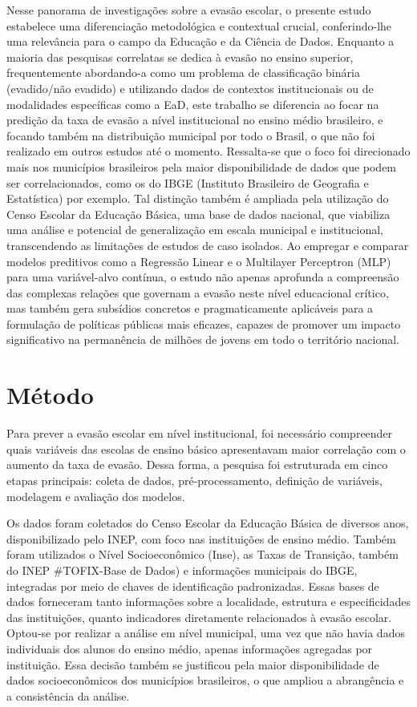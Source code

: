 \documentclass[english, spanish, brazilian]{RBIEarticle} %
\begin{document}
Nesse panorama de investigações sobre a evasão escolar, o presente estudo estabelece uma diferenciação metodológica e contextual crucial, conferindo-lhe uma relevância para o campo da Educação e da Ciência de Dados. Enquanto a maioria das pesquisas correlatas se dedica à evasão no ensino superior, frequentemente abordando-a como um problema de classificação binária (evadido/não evadido) e utilizando dados de contextos institucionais ou de modalidades específicas como a EaD, este trabalho se diferencia ao focar na predição da taxa de evasão a nível institucional no ensino médio brasileiro, e focando também na distribuição municipal por todo o Brasil, o que não foi realizado em outros estudos até o momento. Ressalta-se que o foco foi direcionado mais nos municípios brasileiros pela maior disponibilidade de dados que podem ser correlacionados, como os do IBGE (Instituto Brasileiro de Geografia e Estatística) por exemplo. Tal distinção também é ampliada pela utilização do Censo Escolar da Educação Básica, uma base de dados nacional, que viabiliza uma análise e potencial de generalização em escala municipal e institucional, transcendendo as limitações de estudos de caso isolados. Ao empregar e comparar modelos preditivos como a Regressão Linear e o Multilayer Perceptron (MLP) para uma variável-alvo contínua, o estudo não apenas aprofunda a compreensão das complexas relações que governam a evasão neste nível educacional crítico, mas também gera subsídios concretos e pragmaticamente aplicáveis para a formulação de políticas públicas mais eficazes, capazes de promover um impacto significativo na permanência de milhões de jovens em todo o território nacional.


\section{Método}

Para prever a evasão escolar em nível institucional, foi necessário compreender quais variáveis das escolas de ensino básico apresentavam maior correlação com o aumento da taxa de evasão. Dessa forma, a pesquisa foi estruturada em cinco etapas principais: coleta de dados, pré-processamento, definição de variáveis, modelagem e avaliação dos modelos.

Os dados foram coletados do Censo Escolar da Educação Básica de diversos anos, disponibilizado pelo INEP, com foco nas instituições de ensino médio. Também foram utilizados o Nível Socioeconômico (Inse), as Taxas de Transição, também do INEP \#TOFIX-Base de Dados)  e informações municipais do IBGE, integradas por meio de chaves de identificação padronizadas. Essas bases de dados forneceram tanto informações sobre a localidade, estrutura e especificidades das instituições, quanto indicadores diretamente relacionados à evasão escolar. Optou-se por realizar a análise em nível municipal, uma vez que não havia dados individuais dos alunos do ensino médio, apenas informações agregadas por instituição. Essa decisão também se justificou pela maior disponibilidade de dados socioeconômicos dos municípios brasileiros, o que ampliou a abrangência e a consistência da análise.
\end{document}
